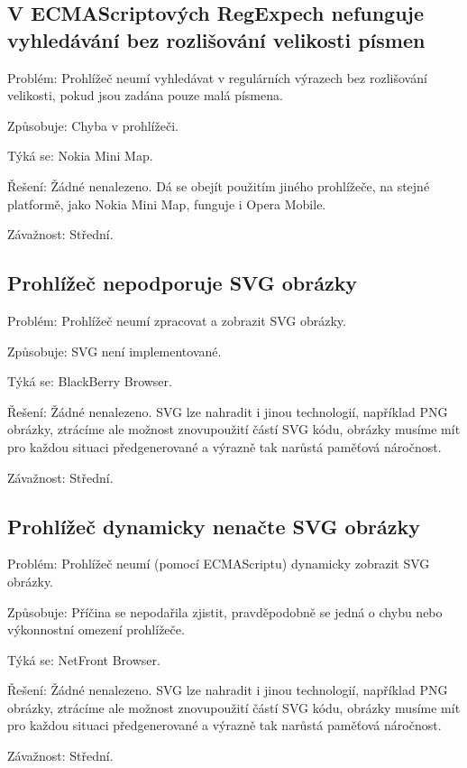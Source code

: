 \subsection{V ECMAScriptových RegExpech nefunguje vyhledávání bez rozlišování velikosti písmen}
\begin{description*}
\item[Problém:] Prohlížeč neumí vyhledávat v regulárních výrazech bez rozlišování velikosti, pokud jsou zadána pouze malá písmena.
\item[Způsobuje:] Chyba v prohlížeči.
\item[Týká se:] Nokia Mini Map.
\item[Řešení:] Žádné nenalezeno. Dá se obejít použitím jiného prohlížeče, na stejné platformě, jako Nokia Mini Map, funguje i Opera Mobile.
\item[Závažnost:] Střední.
\end{description*}

\subsection{Prohlížeč nepodporuje SVG obrázky}
\begin{description*}
\item[Problém:] Prohlížeč neumí zpracovat a zobrazit SVG obrázky.
\item[Způsobuje:] SVG není implementované.
\item[Týká se:] BlackBerry Browser.
\item[Řešení:] Žádné nenalezeno. SVG lze nahradit i jinou technologií, například PNG obrázky, ztrácíme ale možnost znovupoužití částí SVG kódu, obrázky musíme mít pro každou situaci předgenerované a výrazně tak narůstá paměťová náročnost.
\item[Závažnost:] Střední.
\end{description*}

\subsection{Prohlížeč dynamicky nenačte SVG obrázky}
\begin{description*}
\item[Problém:] Prohlížeč neumí (pomocí ECMAScriptu) dynamicky zobrazit SVG obrázky.
\item[Způsobuje:] Příčina se nepodařila zjistit, pravděpodobně se jedná o chybu nebo výkonnostní omezení prohlížeče.
\item[Týká se:] NetFront Browser.
\item[Řešení:] Žádné nenalezeno. SVG lze nahradit i jinou technologií, například PNG obrázky, ztrácíme ale možnost znovupoužití částí SVG kódu, obrázky musíme mít pro každou situaci předgenerované a výrazně tak narůstá paměťová náročnost.
\item[Závažnost:] Střední.
\end{description*}

